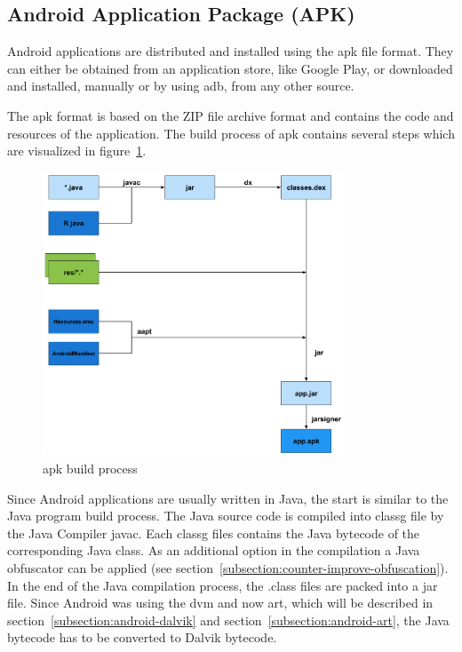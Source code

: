 \subsection{Android Application Package (APK)} \label{subsection:foundation-android-package}
Android applications are distributed and installed using the \gls{apk} file format.
They can either be obtained from an application store, like Google Play, or downloaded and installed, manually or by using \gls{adb}, from any other source.

The \gls{apk} format is based on the ZIP file archive format and contains the code and resources of the application.
The build process of \gls{apk} contains several steps which are visualized in figure~\ref{fig:apk}.
\newline
\begin{figure}[h]
    \centering
    \includegraphics[width=0.8\textwidth]{data/apk.png}
    \caption{\gls{apk} build process \cite{andevconDalvikART}}
    \label{fig:apk}
\end{figure}
Since Android applications are usually written in Java, the start is similar to the Java program build process.
The Java source code is compiled into \gls{classg} file by the Java Compiler javac.
Each \gls{classg} files contains the Java bytecode of the corresponding Java class.
As an additional option in the compilation a Java obfuscator can be applied (see section~\ref{subsection:counter-improve-obfuscation}).
In the end of the Java compilation process, the .class files are packed into a \gls{jar} file.
\newline
Since Android was using the \gls{dvm} and now \gls{art}, which will be described in section~\ref{subsection:android-dalvik} and section~\ref{subsection:android-art}, the Java bytecode has to be converted to Dalvik bytecode.
